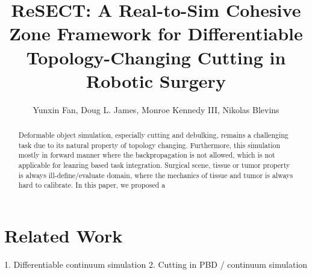 \documentclass[letterpaper, 10 pt, conference]{ieeeconf}  %
\title{\LARGE \bf
ReSECT: A Real-to-Sim Cohesive Zone Framework for Differentiable Topology-Changing Cutting in Robotic Surgery
}
\author{Yunxin Fan, Doug L. James, Monroe Kennedy III, Nikolas Blevins}
\theoremstyle{tight}
\begin{document}
\maketitle
\thispagestyle{empty}
\pagestyle{empty}


\begin{abstract}

Deformable object simulation, especially cutting and debulking, remains a challenging task due to its natural property of topology changing. Furthermore, this simulation mostly in forward manner where the backpropagation is not allowed, which is not applicable for leanring based task integration. Surgical scene, tissue or tumor property is always ill-define/evaluate domain, where the mechanics of tissue and tumor is always hard to calibrate. In this paper, we proposed a 

\end{abstract}


\section{Related Work}

1. Differentiable continuum simulation
2. Cutting in PBD / continuum simulation
% 
%
%
%
\newcommand{\epsgeo}{\varepsilon_{\mathrm{geo}}}
 
\end{document}
